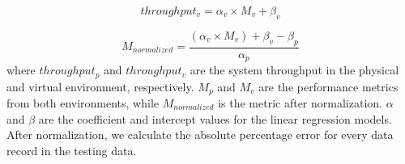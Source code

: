 \begin{equation*}
throughput_{v}= \alpha_{v} \times M_{v} + \beta_{v}
\end{equation*}

\begin{equation*}
M_{normalized} = \frac{(\alpha_{v} \times M_{v})+\beta_{v}-\beta_{p}}{\alpha_{p}}
	\end{equation*}
where $throughput_{p}$ and $throughput_{v}$ are the system throughput in the physical and virtual environment, respectively. $M_{p}$ and $M_{v}$ are the performance metrics from both environments, while $M_{normalized}$ is the metric after normalization. $\alpha$ and $\beta$ are the coefficient and intercept values for the linear regression models. After normalization, we calculate the absolute percentage error for every data record in the testing data.






